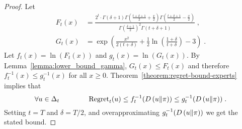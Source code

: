 \begin{proof}
Let
\begin{align*}
F_t(x) & = \frac{2^t \cdot \Gamma(\delta + 1) \Gamma(\frac{t+\delta+1}{2} + \frac{x}{2}) \Gamma(\frac{t+\delta+1}{2} - \frac{x}{2})}{\Gamma(\frac{\delta+1}{2})^2 \Gamma(t+\delta+1)} \; , \\
G_t(x) & = \exp\left(\frac{x^2}{2(t+\delta)} +\frac{1}{2} \ln \left(\frac{1+\delta}{t+\delta}\right) - 3\right) \; .
\end{align*}
Let $f_t(x) = \ln(F_t(x))$ and $g_t(x)=\ln(G_t(x))$. By Lemma~\ref{lemma:lower_bound_gamma}, $G_t(x) \le F_t(x)$
and therefore $f^{-1}_t(x) \leq g^{-1}_t(x)$ for all $x \ge 0$.
Theorem~\ref{theorem:regret-bound-experts} implies that
$$
\forall u \in \Delta_t \qquad \qquad
\operatorname{Regret}_t(u) \le f_t^{-1}(D\left({u}\middle\|{\pi}\right)) \le g_t^{-1}(D\left({u}\middle\|{\pi}\right)) \; .
$$
Setting $t=T$ and $\delta = T/2$, and overapproximating $g_t^{-1}(D\left({u}\middle\|{\pi}\right))$ we get the stated bound.
\end{proof}
